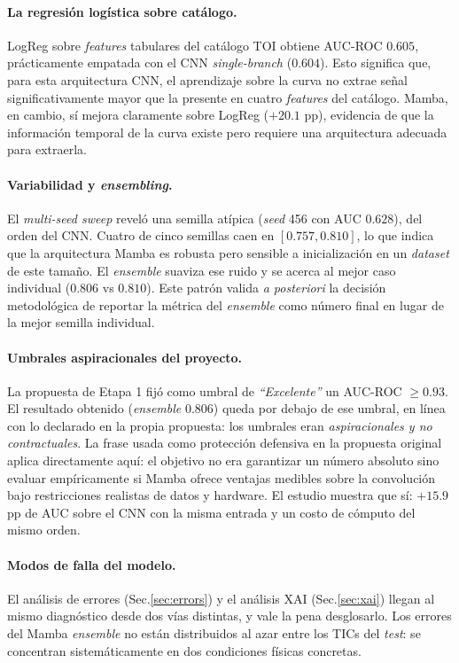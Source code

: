 \documentclass[11pt,a4paper]{article}
\begin{document}
\paragraph{La regresión logística sobre catálogo.}
LogReg sobre \textit{features} tabulares del catálogo TOI obtiene
AUC-ROC $0.605$, prácticamente empatada con el CNN
\textit{single-branch} ($0.604$). Esto significa que, para esta
arquitectura CNN, el aprendizaje sobre la curva no extrae señal
significativamente mayor que la presente en cuatro \textit{features}
del catálogo. Mamba, en cambio, sí mejora claramente sobre LogReg
($+20.1$ pp), evidencia de que la información temporal de la curva
existe pero requiere una arquitectura adecuada para extraerla.

\paragraph{Variabilidad y \textit{ensembling}.}
El \textit{multi-seed sweep} reveló una semilla atípica
(\textit{seed} 456 con AUC $0.628$), del orden del CNN. Cuatro de
cinco semillas caen en $[0.757, 0.810]$, lo que indica que la
arquitectura Mamba es robusta pero sensible a inicialización en un
\textit{dataset} de este tamaño. El \textit{ensemble} suaviza ese
ruido y se acerca al mejor caso individual ($0.806$ vs $0.810$).
Este patrón valida \textit{a posteriori} la decisión metodológica de
reportar la métrica del \textit{ensemble} como número final en lugar
de la mejor semilla individual.

\paragraph{Umbrales aspiracionales del proyecto.}
La propuesta de Etapa 1 fijó como umbral de \textit{``Excelente''} un
AUC-ROC $\geq 0.93$. El resultado obtenido (\textit{ensemble}
$0.806$) queda por debajo de ese umbral, en línea con lo declarado en
la propia propuesta: los umbrales eran \textit{aspiracionales y no
contractuales}. La frase usada como protección defensiva en la
propuesta original aplica directamente aquí: el objetivo no era
garantizar un número absoluto sino evaluar empíricamente si Mamba
ofrece ventajas medibles sobre la convolución bajo restricciones
realistas de datos y hardware. El estudio muestra que sí: $+15.9$ pp
de AUC sobre el CNN con la misma entrada y un costo de cómputo del
mismo orden.

\paragraph{Modos de falla del modelo.}
El análisis de errores (Sec.\ref{sec:errors}) y el análisis XAI
(Sec.\ref{sec:xai}) llegan al mismo diagnóstico desde dos vías
distintas, y vale la pena desglosarlo. Los errores del Mamba
\textit{ensemble} no están distribuidos al azar entre los TICs del
\textit{test}: se concentran sistemáticamente en dos condiciones
físicas concretas.
\end{document}
